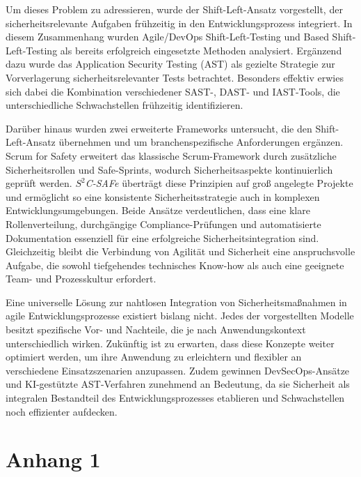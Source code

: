 \documentclass[acmtog]{acmart}
\begin{document}
Um dieses Problem zu adressieren, wurde der Shift-Left-Ansatz vorgestellt, der sicherheitsrelevante Aufgaben frühzeitig in den Entwicklungsprozess integriert. 
In diesem Zusammenhang wurden Agile/DevOps Shift-Left-Testing und Based Shift-Left-Testing als bereits erfolgreich eingesetzte Methoden analysiert. 
Ergänzend dazu wurde das Application Security Testing (AST) als gezielte Strategie zur Vorverlagerung sicherheitsrelevanter Tests betrachtet. 
Besonders effektiv erwies sich dabei die Kombination verschiedener SAST-, DAST- und IAST-Tools, die unterschiedliche Schwachstellen frühzeitig identifizieren.

Darüber hinaus wurden zwei erweiterte Frameworks untersucht, die den Shift-Left-Ansatz übernehmen und um branchenspezifische Anforderungen ergänzen. 
Scrum for Safety erweitert das klassische Scrum-Framework durch zusätzliche Sicherheitsrollen und Safe-Sprints, wodurch Sicherheitsaspekte kontinuierlich geprüft werden. 
\textit{$S^2$C-SAFe} überträgt diese Prinzipien auf groß angelegte Projekte und ermöglicht so eine konsistente Sicherheitsstrategie auch in komplexen Entwicklungsumgebungen. 
Beide Ansätze verdeutlichen, dass eine klare Rollenverteilung, durchgängige Compliance-Prüfungen und automatisierte Dokumentation essenziell für eine erfolgreiche Sicherheitsintegration sind. 
Gleichzeitig bleibt die Verbindung von Agilität und Sicherheit eine anspruchsvolle Aufgabe, die sowohl tiefgehendes technisches Know-how als auch eine geeignete Team- und Prozesskultur erfordert.

Eine universelle Lösung zur nahtlosen Integration von Sicherheitsmaßnahmen in agile Entwicklungsprozesse existiert bislang nicht. 
Jedes der vorgestellten Modelle besitzt spezifische Vor- und Nachteile, die je nach Anwendungskontext unterschiedlich wirken. 
Zukünftig ist zu erwarten, dass diese Konzepte weiter optimiert werden, um ihre Anwendung zu erleichtern und flexibler an verschiedene Einsatzszenarien anzupassen. 
Zudem gewinnen DevSecOps-Ansätze und KI-gestützte AST-Verfahren zunehmend an Bedeutung, da sie Sicherheit als integralen Bestandteil des Entwicklungsprozesses etablieren und Schwachstellen noch effizienter aufdecken.





\appendix

\section{Anhang 1}
\end{document}
